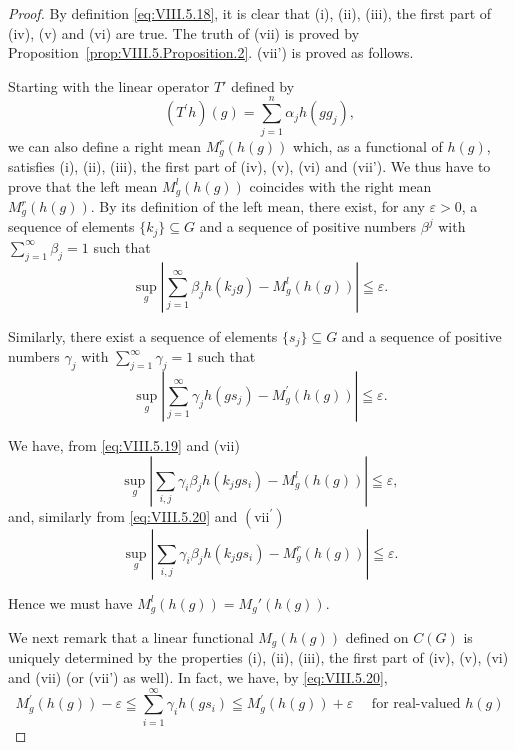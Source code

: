\begin{proof}
 By definition \eqref{eq:VIII.5.18}, it is clear that (i), (ii), (iii), the first part of (iv), (v) and (vi) are true. The truth of (vii) is proved by Proposition~\ref{prop:VIII.5.Proposition.2}. (vii') is proved as follows.


Starting with the linear operator $T'$ defined by 
\[
\left(T ^{\prime} h\right) (g) = \sum\limits_{j=1} ^{n} \alpha_{j} h \left(g g _{j}\right),
\]
we can also define a right mean $M_g^r(h(g))$ which, as a functional of $h(g)$, satisfies (i), (ii), (iii), the first part of (iv), (v), (vi) and (vii'). We thus have to prove that the left mean $M_g^l(h(g))$ coincides with the right mean $M_g^r(h(g))$. By its definition of the left mean, there exist, for any $\varepsilon > 0$, a sequence of elements $\{k_j\} \subseteq G$ and a sequence of positive numbers $\beta^j$ with $\sum\limits_{j=1}^{\infty} \beta_j = 1$ such that
\begin{equation}\label{eq:VIII.5.19}
\sup\limits _{g} \left| \sum\limits_{j=1} ^{\infty} \beta_{j} h (k _{j} g) - M _{g} ^{l} (h (g)) \right| \leqq \varepsilon .
\end{equation}

Similarly, there exist a sequence of elements $\{s_j\} \subseteq G$ and a sequence of positive numbers $\gamma_j$ with $\sum\limits_{j=1}^{\infty} \gamma_j = 1$ such that 
\begin{equation}\label{eq:VIII.5.20}
\sup\limits _{g} \left| \sum\limits_{j=1} ^{\infty} \gamma_{j} h (g s _{j}) - M _{g} ^{\prime} (h (g)) \right| \leqq \varepsilon .
\end{equation}

We have, from \eqref{eq:VIII.5.19} and (vii) 
\[
\sup\limits _{g} \left| \sum\limits_{i,j} \gamma_{i} \beta_{j} h (k _{j} g s _{i}) - M _{g} ^{l} (h (g)) \right| \leqq \varepsilon ,
\]
and, similarly from \eqref{eq:VIII.5.20} and $(\mathrm{vii}^{\prime})$ 
\[
\sup\limits _{g} \left| \sum\limits_{i,j} \gamma_{i} \beta_{j} h (k _{j} g s _{i}) - M _{g} ^{r} (h (g)) \right| \leqq \varepsilon .
\]

Hence we must have $M_g^l(h(g)) = M_g'(h(g))$. 

We next remark that a linear functional $M_{g}(h(g))$ defined on $C(G)$ is uniquely determined by the properties (i), (ii), (iii), the first part of (iv), (v), (vi) and (vii) (or (vii') as well). In fact, we have, by \eqref{eq:VIII.5.20},
\[
M _{g} ^{\prime} (h (g)) - \varepsilon \leqq \sum\limits_{i=1} ^{\infty} \gamma_{i} h (g s _{i}) \leqq M _{g} ^{\prime} (h (g)) + \varepsilon \quad \text{ for real-valued } h (g)
\]


\end{proof}
